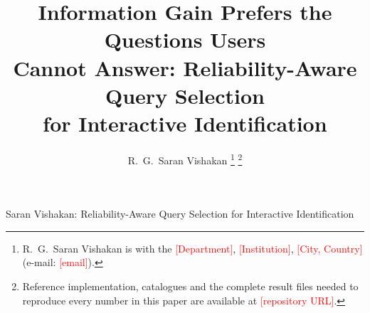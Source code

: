 \documentclass[journal]{IEEEtran}
\begin{document}
\title{Information Gain Prefers the Questions Users\\
Cannot Answer: Reliability-Aware Query Selection\\
for Interactive Identification}

\author{R.~G.~Saran Vishakan%
\thanks{R.~G.~Saran Vishakan is with the \textcolor{red}{[Department]},
\textcolor{red}{[Institution]}, \textcolor{red}{[City, Country]}
(e-mail: \textcolor{red}{[email]}).}%
\thanks{Reference implementation, catalogues and the complete result files
needed to reproduce every number in this paper are available at
\textcolor{red}{[repository URL]}.}}

%
{Saran Vishakan: Reliability-Aware Query Selection for Interactive Identification}

\maketitle















\end{document}
